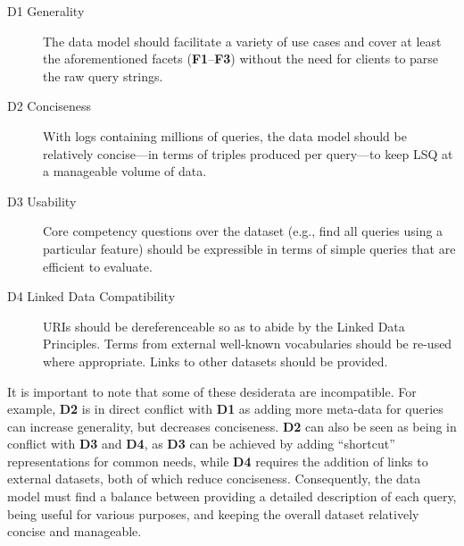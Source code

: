 \begin{description}
\item[D1 Generality] The data model should facilitate a variety of use cases and cover at least the aforementioned facets (\textbf{F1}--\textbf{F3}) without the need for clients to parse the raw query strings.
\item[D2 Conciseness] With logs containing millions of queries, the data model should be relatively concise---in terms of triples produced per query---to keep LSQ at a manageable volume of data.
\item[D3 Usability] Core competency questions over the dataset (e.g., find all queries using a particular feature) should be expressible in terms of simple queries that are efficient to evaluate.
\item[D4 Linked Data Compatibility] URIs should be dereferenceable so as to abide by the Linked Data Principles. Terms from external well-known vocabularies should be re-used where appropriate. Links to other datasets should be provided.
\end{description}

It is important to note that some of these desiderata are incompatible. For example, \textbf{D2} is in direct conflict with \textbf{D1} as adding more meta-data for queries can increase generality, but decreases conciseness. \textbf{D2} can also be seen as being in conflict with \textbf{D3} and \textbf{D4}, as \textbf{D3} can be achieved by adding ``shortcut'' representations for common needs, while \textbf{D4} requires the addition of links to external datasets, both of which reduce conciseness. Consequently, the data model must find a balance between providing a detailed description of each query, being useful for various purposes, and keeping the overall dataset relatively concise and manageable.


